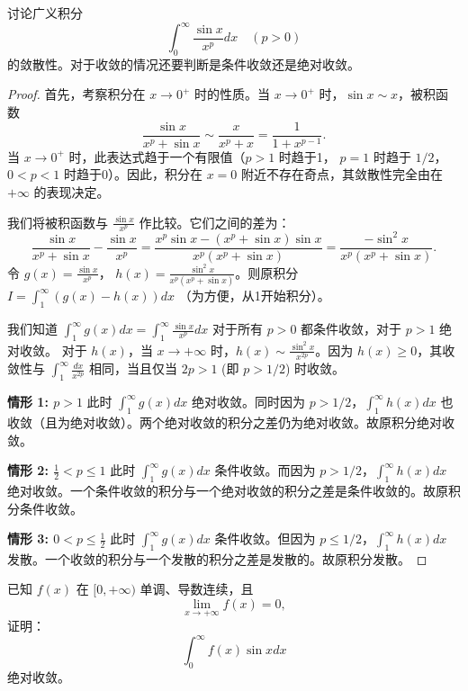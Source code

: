 \documentclass[lang=cn,10pt,thmcnt=section]{elegantbook}
\begin{document}
\begin{example}
	讨论广义积分 
\[
\int_{0}^{\infty} \frac{\sin x}{x^p} dx \quad ( p > 0 )
\] 
的敛散性。对于收敛的情况还要判断是条件收敛还是绝对收敛。
\begin{proof}
    首先，考察积分在 $x \to 0^+$ 时的性质。当 $x \to 0^+$ 时，$\sin x \sim x$，被积函数
    \[ \frac{\sin x}{x^p + \sin x} \sim \frac{x}{x^p + x} = \frac{1}{1 + x^{p-1}}. \]
    当 $x \to 0^+$ 时，此表达式趋于一个有限值（$p>1$ 时趋于1， $p=1$ 时趋于 $1/2$，$0<p<1$ 时趋于0）。因此，积分在 $x=0$ 附近不存在奇点，其敛散性完全由在 $+\infty$ 的表现决定。
    
    我们将被积函数与 $\frac{\sin x}{x^p}$ 作比较。它们之间的差为：
    \[ \frac{\sin x}{x^p + \sin x} - \frac{\sin x}{x^p} = \frac{x^p \sin x - (x^p + \sin x)\sin x}{x^p(x^p + \sin x)} = \frac{-\sin^2 x}{x^p(x^p + \sin x)}. \]
    令 $g(x) = \frac{\sin x}{x^p}$， $h(x) = \frac{\sin^2 x}{x^p(x^p + \sin x)}$。则原积分 $I = \int_1^\infty (g(x) - h(x)) dx$ （为方便，从1开始积分）。
    
    我们知道 $\int_1^\infty g(x) dx = \int_1^\infty \frac{\sin x}{x^p} dx$ 对于所有 $p>0$ 都条件收敛，对于 $p>1$ 绝对收敛。
    对于 $h(x)$，当 $x \to +\infty$ 时，$h(x) \sim \frac{\sin^2 x}{x^{2p}}$。因为 $h(x) \ge 0$，其收敛性与 $\int_1^\infty \frac{dx}{x^{2p}}$ 相同，当且仅当 $2p > 1$ (即 $p > 1/2$) 时收敛。

    \textbf{情形 1: \( p > 1 \)}
    此时 $\int_1^\infty g(x) dx$ 绝对收敛。同时因为 $p > 1/2$，$\int_1^\infty h(x) dx$ 也收敛（且为绝对收敛）。两个绝对收敛的积分之差仍为绝对收敛。故原积分绝对收敛。

    \textbf{情形 2: \( \frac{1}{2} < p \leq 1 \)}
    此时 $\int_1^\infty g(x) dx$ 条件收敛。而因为 $p > 1/2$，$\int_1^\infty h(x) dx$ 绝对收敛。一个条件收敛的积分与一个绝对收敛的积分之差是条件收敛的。故原积分条件收敛。
    
    \textbf{情形 3: \( 0 < p \leq \frac{1}{2} \)}
    此时 $\int_1^\infty g(x) dx$ 条件收敛。但因为 $p \le 1/2$，$\int_1^\infty h(x) dx$ 发散。一个收敛的积分与一个发散的积分之差是发散的。故原积分发散。
\end{proof}

\end{example}
\begin{example}
	已知 \( f(x) \) 在 \([0, +\infty)\) 单调、导数连续，且  
\[
\lim_{x \to +\infty} f(x) = 0,
\] 
证明：
\[
\int_{0}^{\infty} f(x) \sin x dx
\] 
绝对收敛。
\end{example}
\end{document}
